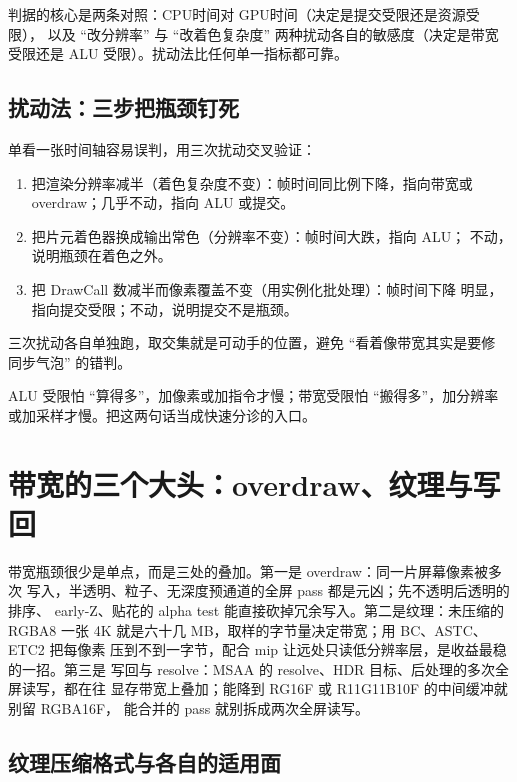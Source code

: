 \documentclass[12pt,a4paper,fontset=fandol]{ctexbook}
\newcommand{\Lang}[1]{\textsf{#1}}
\newcommand{\DomCPU}{\Lang{CPU}}
\newcommand{\DomGPU}{\Lang{GPU}}
\begin{document}
判据的核心是两条对照：\DomCPU 时间对 \DomGPU 时间（决定是提交受限还是资源受限），
以及 ``改分辨率'' 与 ``改着色复杂度'' 两种扰动各自的敏感度（决定是带宽受限还是
ALU 受限）。扰动法比任何单一指标都可靠。

\subsection{扰动法：三步把瓶颈钉死}

单看一张时间轴容易误判，用三次扰动交叉验证：
\begin{enumerate}
  \item 把渲染分辨率减半（着色复杂度不变）：帧时间同比例下降，指向带宽或
        overdraw；几乎不动，指向 ALU 或提交。
  \item 把片元着色器换成输出常色（分辨率不变）：帧时间大跌，指向 ALU；
        不动，说明瓶颈在着色之外。
  \item 把 DrawCall 数减半而像素覆盖不变（用实例化批处理）：帧时间下降
        明显，指向提交受限；不动，说明提交不是瓶颈。
\end{enumerate}
三次扰动各自单独跑，取交集就是可动手的位置，避免 ``看着像带宽其实是要修
同步气泡'' 的错判。

\begin{compare}[title={ALU 与带宽，一句话区分}]
ALU 受限怕 ``算得多''，加像素或加指令才慢；带宽受限怕 ``搬得多''，加分辨率
或加采样才慢。把这两句话当成快速分诊的入口。
\end{compare}

\section{带宽的三个大头：overdraw、纹理与写回}

带宽瓶颈很少是单点，而是三处的叠加。第一是 overdraw：同一片屏幕像素被多次
写入，半透明、粒子、无深度预通道的全屏 pass 都是元凶；先不透明后透明的排序、
early-Z、贴花的 alpha test 能直接砍掉冗余写入。第二是纹理：未压缩的 RGBA8
一张 4K 就是六十几 MB，取样的字节量决定带宽；用 BC、ASTC、ETC2 把每像素
压到不到一字节，配合 mip 让远处只读低分辨率层，是收益最稳的一招。第三是
写回与 resolve：MSAA 的 resolve、HDR 目标、后处理的多次全屏读写，都在往
显存带宽上叠加；能降到 RG16F 或 R11G11B10F 的中间缓冲就别留 RGBA16F，
能合并的 pass 就别拆成两次全屏读写。

\subsection{纹理压缩格式与各自的适用面}
\end{document}
